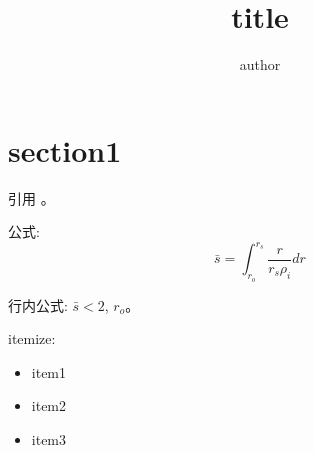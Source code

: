 \documentclass{article}
\title{title}
\author{author}
\begin{document}
\maketitle

\tableofcontents

\section{section1}
引用 \cite{tuszewski1988field}。

公式:
\begin{equation}
\bar{s} = \int_{r_o}^{r_s} \frac{r}{r_s \rho_i}   dr
\end{equation}

行内公式: $\bar{s}<2$, $r_o$。



itemize:
\begin{itemize}
\item item1
\item item2
\item item3
\end{itemize}
\end{document}
